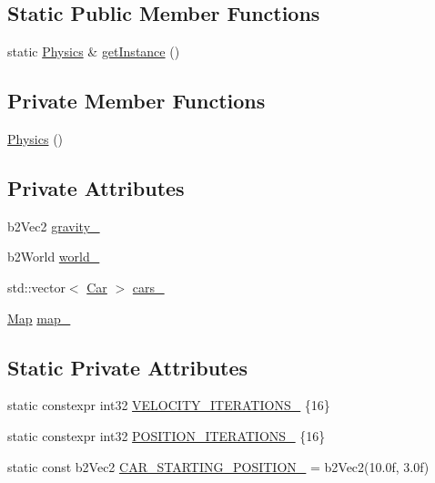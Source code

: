 \subsection*{Static Public Member Functions}
\begin{DoxyCompactItemize}
\item 
static \hyperlink{classPhysics}{Physics} \& \hyperlink{classPhysics_ab0590d6f12821b4e4a3ef894663704a1}{get\+Instance} ()
\end{DoxyCompactItemize}
\subsection*{Private Member Functions}
\begin{DoxyCompactItemize}
\item 
\hyperlink{classPhysics_a4b2ebc0a344f04f48d227c72f0d0fbda}{Physics} ()
\end{DoxyCompactItemize}
\subsection*{Private Attributes}
\begin{DoxyCompactItemize}
\item 
b2\+Vec2 \hyperlink{classPhysics_a458f9e43685bda01b57e001b9793aed4}{gravity\+\_\+}
\item 
b2\+World \hyperlink{classPhysics_a6f9efee327d116528efb9fd16b405bc6}{world\+\_\+}
\item 
std\+::vector$<$ \hyperlink{classCar}{Car} $>$ \hyperlink{classPhysics_ad798f52a18a2e5975f349b1fd95ceefc}{cars\+\_\+}
\item 
\hyperlink{classMap}{Map} \hyperlink{classPhysics_a1f2b9c2d5ad391eff5e6ebd5cdf495fe}{map\+\_\+}
\end{DoxyCompactItemize}
\subsection*{Static Private Attributes}
\begin{DoxyCompactItemize}
\item 
static constexpr int32 \hyperlink{classPhysics_a8d5ed35d229b2ddd31656165b75d3c5a}{V\+E\+L\+O\+C\+I\+T\+Y\+\_\+\+I\+T\+E\+R\+A\+T\+I\+O\+N\+S\+\_\+} \{16\}
\item 
static constexpr int32 \hyperlink{classPhysics_a90cdfb590e59b99d0950ca696b00894c}{P\+O\+S\+I\+T\+I\+O\+N\+\_\+\+I\+T\+E\+R\+A\+T\+I\+O\+N\+S\+\_\+} \{16\}
\item 
static const b2\+Vec2 \hyperlink{classPhysics_a960c795e535acff932299971c93aa166}{C\+A\+R\+\_\+\+S\+T\+A\+R\+T\+I\+N\+G\+\_\+\+P\+O\+S\+I\+T\+I\+O\+N\+\_\+} = b2\+Vec2(10.\+0f, 3.\+0f)
\end{DoxyCompactItemize}



